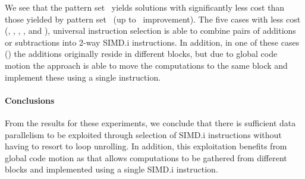 We see that the \gls{pattern set}~ yields \glspl{solution}
with significantly less cost than those yielded by \gls{pattern
  set}~ (up to~\printZCNorm{%
  \SimdVsWithoutCyclesSpeedupCyclesZeroCenteredSpeedupMax%
} improvement).
%
The five cases with less cost (,
, , , and
), \gls{universal instruction selection} is able to combine pairs
of additions or subtractions into \num{2}-way \gls{SIMD.i} \glspl{instruction}.
%
In addition, in one of these cases () the additions
originally reside in different \glspl{block}, but due to \gls{global code
  motion} the approach is able to move the computations to the same \gls{block}
and implement these using a single \gls{instruction}.


\paragraph{Conclusions}

From the results for these experiments, we conclude that there is sufficient
data parallelism to be exploited through selection of \gls{SIMD.i}
\glspl{instruction} without having to resort to \gls{loop unrolling}.
%
In addition, this exploitation benefits from \gls{global code motion} as that
allows computations to be gathered from different \glspl{block} and implemented
using a single \gls{SIMD.i} \gls{instruction}.
